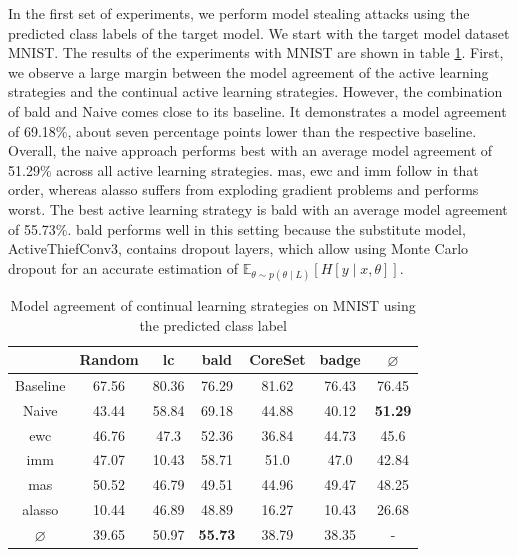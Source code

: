 In the first set of experiments, we perform model stealing attacks using the predicted class labels of the target model. We start with the target model dataset MNIST. 
The results of the experiments with MNIST are shown in table \ref{fig:ModelStealingMNISTLabel}. First, we observe a large margin between the model agreement
of the active learning strategies and the continual active learning strategies. However, the combination of \gls{bald} and Naive comes close to
its baseline. It demonstrates a model agreement of 69.18\%, about seven percentage points lower than the respective baseline. Overall, the naive approach performs
best with an average model agreement of 51.29\% across all active learning strategies. \gls{mas}, \gls{ewc} and \gls{imm} follow in that order, whereas \gls{alasso} 
suffers from exploding gradient problems and performs worst. The best active learning strategy is \gls{bald} with an average model agreement of 55.73\%. \gls{bald}
performs well in this setting because the substitute model, ActiveThiefConv3, contains dropout layers, which allow using Monte Carlo dropout for an accurate estimation
of $\mathbb{E}_{\theta \sim p(\theta \mid L)} [H[y \mid x, \theta]]$. \par

\begin{table}[h]
    \centering
    \begin{tabular}{c | c c c c c | c } 
         & Random & \gls{lc} & \gls{bald} & CoreSet & \gls{badge} & $\varnothing$ \\ 
        \hline
        Baseline & 67.56 & 80.36 & 76.29 & 81.62 & 76.43 & 76.45\\
        \hline
        Naive & 43.44 & 58.84 & 69.18 & 44.88 & 40.12 & \textbf{51.29}\\
        \gls{ewc} &  46.76 & 47.3 & 52.36 & 36.84 & 44.73 & 45.6\\
        \gls{imm} & 47.07 & 10.43 & 58.71 & 51.0 & 47.0 & 42.84\\
        \gls{mas} & 50.52 & 46.79 & 49.51 & 44.96 & 49.47 & 48.25\\
        \gls{alasso} & 10.44 & 46.89 & 48.89 & 16.27 & 10.43 & 26.68\\
        \hline
        $\varnothing$ & 39.65 & 50.97 & \textbf{55.73} & 38.79 & 38.35 & -\\
    \end{tabular}
    \caption{Model agreement of continual learning strategies on MNIST using the predicted class label}
    \label{fig:ModelStealingMNISTLabel}
\end{table}



